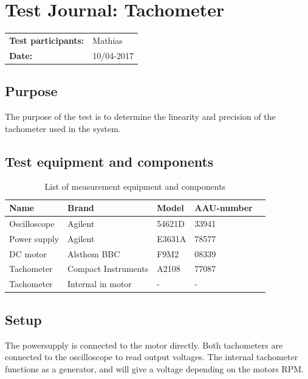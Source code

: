 \graphicspath{{figures/design/}}
\chapter{Test Journal: Tachometer}\label{appendix:RPMTest}
\begin{table}[!h]
\begin{tabular}{l l}
\textbf{Test participants:} & Mathias  \\
\textbf{Date:}  & 10/04-2017
\end{tabular}
\end{table}

\section*{Purpose}
The purpose of the test is to determine the linearity and precision of the tachometer used in the system.
\section*{Test equipment and components}
\begin{table}[htbp]
	\centering
	\caption{List of measurement equipment and components}\label{tab_appendix:RPMSetup}
	\begin{tabularx}{\textwidth}{lXXXX}
		Name & Brand & Model & AAU-number \\ \toprule \rowcolor{lightGrey}
		Oscilloscope	& Agilent & 54621D & 33941 	\\
		Power supply	& Agilent & E3631A & 78577\\ 
		\rowcolor{lightGrey}	
		DC motor & Alsthom BBC & F9M2& 08339\\
		Tachometer & Compact \newline Instruments & A2108& 77087 \\ \rowcolor{lightGrey}
		Tachometer & Internal in motor& - & -
	\end{tabularx}
\end{table}
\section*{Setup}
The powersupply is connected to the motor directly. Both tachometers are connected to the oscilloscope to read output voltages. The internal tachometer functions as a generator, and will give a voltage depending on the motors RPM.  
